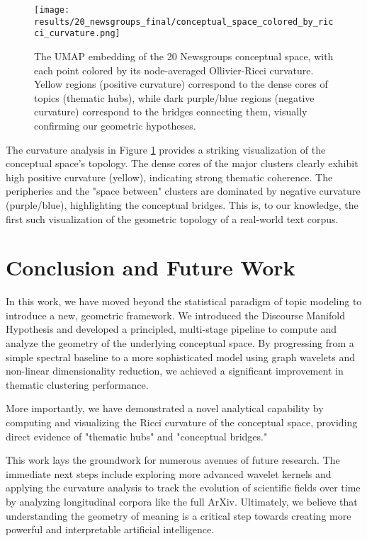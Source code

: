 \documentclass[11pt, letterpaper]{article}
\begin{document}
\begin{figure}[h!]
    \centering
    \texttt{[image: results/20\_newsgroups\_final/conceptual\_space\_colored\_by\_ricci\_curvature.png]}
    \caption{The UMAP embedding of the 20 Newsgroups conceptual space, with each point colored by its node-averaged Ollivier-Ricci curvature. Yellow regions (positive curvature) correspond to the dense cores of topics (thematic hubs), while dark purple/blue regions (negative curvature) correspond to the bridges connecting them, visually confirming our geometric hypotheses.}
    \label{fig:curvature}
\end{figure}

The curvature analysis in Figure \ref{fig:curvature} provides a striking visualization of the conceptual space's topology. The dense cores of the major clusters clearly exhibit high positive curvature (yellow), indicating strong thematic coherence. The peripheries and the "space between" clusters are dominated by negative curvature (purple/blue), highlighting the conceptual bridges. This is, to our knowledge, the first such visualization of the geometric topology of a real-world text corpus.

\section{Conclusion and Future Work}
In this work, we have moved beyond the statistical paradigm of topic modeling to introduce a new, geometric framework. We introduced the Discourse Manifold Hypothesis and developed a principled, multi-stage pipeline to compute and analyze the geometry of the underlying conceptual space. By progressing from a simple spectral baseline to a more sophisticated model using graph wavelets and non-linear dimensionality reduction, we achieved a significant improvement in thematic clustering performance.

More importantly, we have demonstrated a novel analytical capability by computing and visualizing the Ricci curvature of the conceptual space, providing direct evidence of "thematic hubs" and "conceptual bridges."

This work lays the groundwork for numerous avenues of future research. The immediate next steps include exploring more advanced wavelet kernels and applying the curvature analysis to track the evolution of scientific fields over time by analyzing longitudinal corpora like the full ArXiv. Ultimately, we believe that understanding the geometry of meaning is a critical step towards creating more powerful and interpretable artificial intelligence.
\end{document}
